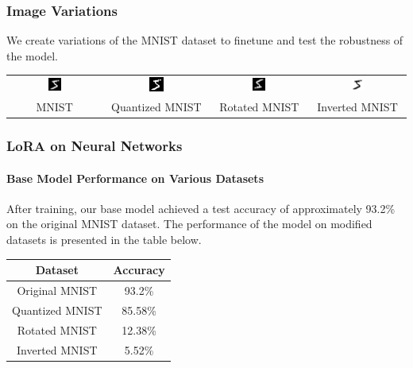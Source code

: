 \documentclass{beamer}
\begin{document}
        \begin{frame}
        \frametitle{Image Variations}
        We create variations of the MNIST dataset to finetune and test the robustness of the model.

        \begin{center}
            \begin{tabular}{@{}cccc@{}}
                \includegraphics[width=0.15\textwidth]{images/normal_5.png} &
                \includegraphics[width=0.15\textwidth]{images/quantized_5.png} &
                \includegraphics[width=0.15\textwidth]{images/rotated_5.png} &
                \includegraphics[width=0.15\textwidth]{images/inverted_5.png} \\
                MNIST & Quantized MNIST & Rotated MNIST & Inverted MNIST
            \end{tabular}
        \end{center}
    
    \end{frame}
    \begin{frame}
        \frametitle{LoRA on Neural Networks}
        \framesubtitle{Base Model Performance on Various Datasets}
    
        After training, our base model achieved a test accuracy of approximately 93.2\% on the original MNIST dataset. The performance of the model on modified datasets is presented in the table below.
    
        \begin{table}[h]
        \centering
        \begin{tabular}{|c|c|}
        \hline
        Dataset & Accuracy \\
        \hline
        Original MNIST & 93.2\% \\
        Quantized MNIST & 85.58\% \\
        Rotated MNIST & 12.38\% \\
        Inverted MNIST & 5.52\% \\
        \hline
        \end{tabular}
        \end{table}
    \end{frame}
\end{document}

